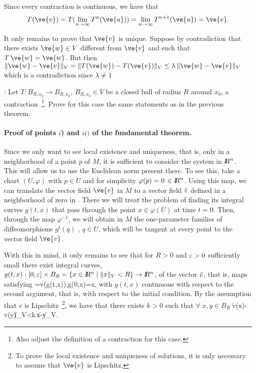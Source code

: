 Since every contraction is continuous, we have that $$T(\ve{v}) = T (
\lim_{n\to\infty} T^n(\ve{u}))=\lim_{n\to\infty}T^{n+1}(\ve{u})=\ve{v}.$$

It only remains to prove that $\ve{v}$ is unique. Suppose by contradiction
that there exists $\ve{w}\in V$ different from $\ve{v}$ and such that $T\,\ve{w}=\ve{w}$. 
But
then 
$\|\ve{w}-\ve{v}\|_V=\|T(\ve{w})-T(\ve{v})\|_V\leq\lambda\,\|\ve{w}-\ve{v}\|_V$ 
which is a contradiction since $\lambda\neq 1$ 
\epru

\ejer: 
Let $T: B_{R,x_0} \to B_{R,x_0}$, $B_{R,x_0} \in V$ be a closed ball
of radius $R$ around $x_0$, a contraction~\footnote{Also adjust the definition of a contraction for this case.}. 
Prove for
this case the same statements as in the previous theorem.
\espa


\paragraph{Proof of points $i$) and $ii)$ of the fundamental theorem.}

Since we only want to see local existence and uniqueness, that is, only in
a neighborhood of a point $p$ of $M$, it is sufficient to consider the system
in $\mbox{\sl {l$\!\!\!\;\:\!$R}}^n$. This will allow us to use the Euclidean norm present there.
To see this, take a chart $(U,\varphi)$ with $p\in U$ and for
simplicity $\varphi(p)=0\,\in\mbox{\sl {l$\!\!\!\;\:\!$R}}^n$. Using this map, we can
translate the vector field $\ve{v}$ in $M$ to a vector field $\tilde
v$ defined in a neighborhood of zero in \ren.  There we will treat the
problem of finding its integral curves $g(t,x)$ that pass through the
point $x\in\varphi(U)$ at time $t=0$. Then, through the map
$\varphi^{-1}$, we will obtain in $M$ the one-parameter families of
diffeomorphisms  $g^t(q)$ , $q\in U$, which will be tangent at every
point to the vector field $\ve{v}$.

With this in mind, it only remains to see that for $R>0$ and $\mbox{$\varepsilon$}>0$
sufficiently small 
there exist integral curves, 
$g(t,x):[0,\eps] \times B_R=\{x\in \ren
\;|\;\|x\|_V < R  \} \to \ren$,  
of the vector $\tilde v$, that is, maps satisfying
\beq  
{}=\ti v(g(t,x))\;\;\;,\;\;\;\;\;g(0,x)=x,
\label{7*}\eeq
with $g(t,x)$ continuous with respect to the second argument, that is, with
respect to the initial condition. By the assumption that $v$
is Lipschitz~\footnote{To prove the local existence and uniqueness of solutions, it is only 
necessary to assume that $\ve{v}$ is Lipschitz.}, 
we have that there exists $k>0$ such that $\forall\;x,y\in B_R$
\beq
\|\ti v(x)-\ti v(y)\|_V<k\,\|x-y\|_V\;.\eeq

